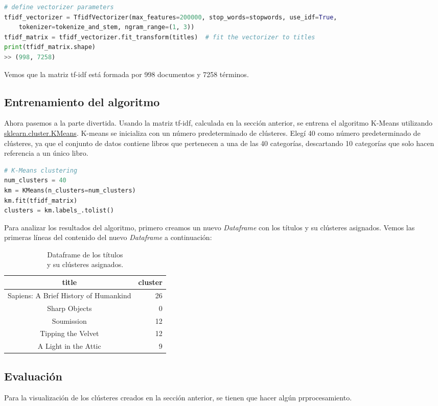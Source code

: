 \documentclass{uimppracticas}
\begin{document}
\begin{lstlisting}[language=python]
# define vectorizer parameters
tfidf_vectorizer = TfidfVectorizer(max_features=200000, stop_words=stopwords, use_idf=True,
	tokenizer=tokenize_and_stem, ngram_range=(1, 3))
tfidf_matrix = tfidf_vectorizer.fit_transform(titles)  # fit the vectorizer to titles
print(tfidf_matrix.shape)
>> (998, 7258)
\end{lstlisting}

Vemos que la matriz tf-idf está formada por 998 documentos y 7258 términos.

\subsection{Entrenamiento del algoritmo}

Ahora pasemos a la parte divertida. Usando la matriz tf-idf, calculada en la sección anterior, se entrena el algoritmo K-Means utilizando \href{https://scikit-learn.org/stable/modules/generated/sklearn.cluster.KMeans.html}{sklearn.cluster.KMeans}. K-means se inicializa con un número predeterminado de clústeres. Elegí 40 como número predeterminado de clústeres, ya que el conjunto de datos contiene libros que pertenecen a una de las 40 categorías, descartando 10 categorías que solo hacen referencia a un único libro.

\begin{lstlisting}[language=python]
# K-Means clustering
num_clusters = 40
km = KMeans(n_clusters=num_clusters)
km.fit(tfidf_matrix)
clusters = km.labels_.tolist()
\end{lstlisting}

Para analizar los resultados del algoritmo, primero creamos un nuevo \textit{Dataframe} con los títulos y su clústeres asignados. Vemos las primeras líneas del contenido del nuevo \textit{Dataframe} a continuación:

\begin{table}[h]
	\centering
	\begin{tabular}{cr}
		\toprule
		title &  cluster \\
		\midrule
		Sapiens: A Brief History of Humankind & 26 \\
		Sharp Objects & 0 \\
		Soumission & 12 \\
		Tipping the Velvet & 12 \\
		A Light in the Attic & 9 \\
		\bottomrule
	\end{tabular}
	\caption{Dataframe de los títulos \\ y su clústeres asignados.}
	\label{table2}
\end{table}


\subsection{Evaluación}


Para la visualización de los clústeres creados en la sección anterior, se tienen que hacer algún prprocesamiento.
\renewcommand{\refname}{Bibliografía}


\end{document}
